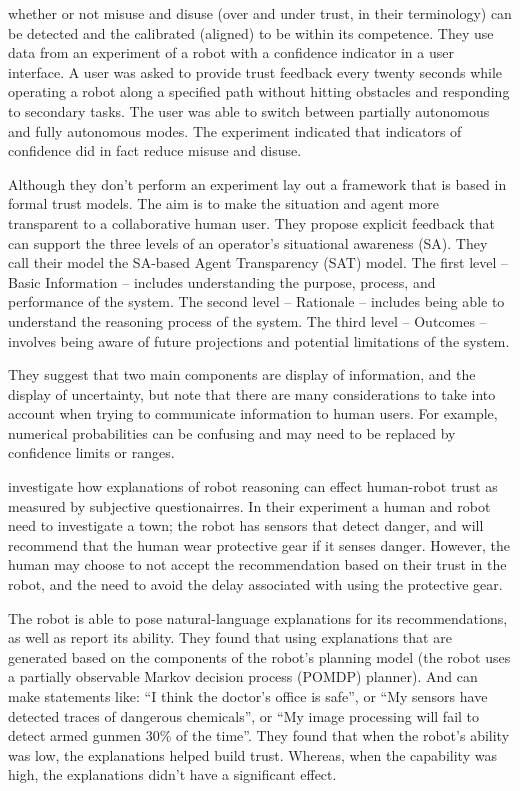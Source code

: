 \citet{Kaniarasu2013-ho} whether or not misuse and disuse (over and under trust, in their terminology) can be detected and the calibrated (aligned) to be within its competence. They use data from an experiment of a robot with a confidence indicator in a user interface. A user was asked to provide trust feedback every twenty seconds while operating a robot along a specified path without hitting obstacles and responding to secondary tasks. The user was able to switch between partially autonomous and fully autonomous modes. The experiment indicated that indicators of confidence did in fact reduce misuse and disuse.

Although they don't perform an experiment \citet{Chen2014-dk} lay out a framework that is based in formal trust models. The aim is to make the situation and agent more transparent to a collaborative human user. They propose explicit feedback that can support the three levels of an operator's situational awareness (SA). They call their model the SA-based Agent Transparency (SAT) model. The first level -- Basic Information -- includes understanding the purpose, process, and performance of the system. The second level -- Rationale -- includes being able to understand the reasoning process of the system. The third level -- Outcomes -- involves being aware of future projections and potential limitations of the system. 

They suggest that two main components are display of information, and the display of uncertainty, but note that there are many considerations to take into account when trying to communicate information to human users. For example, numerical probabilities can be confusing and may need to be replaced by confidence limits or ranges.

\citet{Wang2016-id} investigate how explanations of robot reasoning can effect human-robot trust as measured by subjective questionairres. In their experiment a human and robot need to investigate a town; the robot has sensors that detect danger, and will recommend that the human wear protective gear if it senses danger. However, the human may choose to not accept the recommendation based on their trust in the robot, and the need to avoid the delay associated with using the protective gear.

The robot is able to pose natural-language explanations for its recommendations, as well as report its ability. They found that using explanations that are generated based on the components of the robot's planning model (the robot uses a partially observable Markov decision process (POMDP) planner). And can make statements like: ``I think the doctor's office is safe'', or ``My sensors have detected traces of dangerous chemicals'', or ``My image processing will fail to detect armed gunmen 30\% of the time''. They found that when the robot's ability was low, the explanations helped build trust. Whereas, when the capability was high, the explanations didn't have a significant effect.

